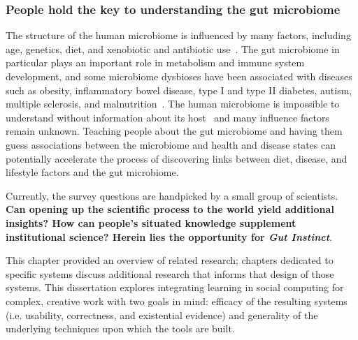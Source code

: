 \subsubsection{People hold the key to understanding the gut microbiome}
The structure of the human microbiome is influenced by many factors, including age, genetics, diet, and xenobiotic and antibiotic use~\cite{Gill2006}. The gut microbiome in particular plays an important role in metabolism and immune system development, and some microbiome dysbioses have been associated with diseases such as obesity, inflammatory bowel disease, type I and type II diabetes, autism, multiple sclerosis, and malnutrition~\cite{Cho2012}. The human microbiome is impossible to understand without information about its host~\cite{Debelius2016} and many influence factors remain unknown. Teaching people about the gut microbiome and having them guess associations between the microbiome and health and disease states can potentially accelerate the process of discovering links between diet, disease, and lifestyle factors and the gut microbiome.

Currently, the survey questions are handpicked
by a small group of scientists. \textbf{Can opening up the
scientific process to the world yield additional insights?
How can people’s situated knowledge supplement institutional
science? Herein lies the opportunity for \textit{Gut Instinct}}.


This chapter provided an overview of related research; chapters dedicated to specific systems discuss additional research that informs that design of those systems. This dissertation explores integrating learning in social computing for complex, creative work with two goals in mind: efficacy of the resulting systems (i.e. usability, correctness, and existential evidence) and generality of the underlying techniques upon which the tools are built.